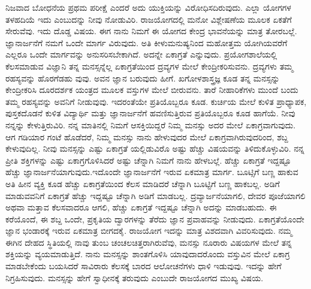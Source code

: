 ನಿಜವಾದ ಬೋಧನೆಯ ಪ್ರಥಮ ಪರೀಕ್ಷೆ ಎಂದರೆ ಅದು ಯುಕ್ತಿಯನ್ನು ವಿರೋಧಿಸದಿರುವುದು. ಎಲ್ಲಾ ಯೋಗಗಳ ತಳಹದಿಯೆ ಇದು ಎಂಬುದನ್ನು ನೀವು ನೋಡುವಿರಿ. ರಾಜಯೋಗದಲ್ಲಿ ಮನೋ ವಿಶ್ಲೇಷಣೆಯ ಮೂಲಕ ಏಕತೆಗೆ ಸೇರುವೆವು. ಇದು ದೊಡ್ಡ ವಿಷಯ. ಈಗ ನಾನು ನಿಮಗೆ ಈ ಯೋಗದ ಕೇಂದ್ರ ಭಾವನೆಯನ್ನು ಮಾತ್ರ ತೋರಬಲ್ಲೆ. ಜ್ಞಾನಾರ್ಜನೆಗೆ ನಮಗೆ ಒಂದೇ ಮಾರ್ಗ ವಿರುವುದು. ಅತಿ ಕೀಳುಮನುಷ್ಯನಿಂದ ಮಹೋತ್ತಮ ಯೋಗಿಯವರೆಗೆ ಎಲ್ಲರೂ ಒಂದೇ ಮಾರ್ಗವನ್ನು ಅನುಸರಿಸಬೇಕಾಗಿದೆ. ಅದನ್ನೇ ಏಕಾಗ್ರತೆ ಎನ್ನುವುದು. ಪ್ರಯೋಗಶಾಲೆಯಲ್ಲಿ ಕೆಲಸಮಾಡುವ ವಿಜ್ಞಾನಿ ತನ್ನ ಮನಸ್ಸನ್ನೆಲ್ಲ ಏಕಾಗ್ರತೆಯಿಂದ ದ್ರವ್ಯಗಳ ಮೇಲೆ ಕೇಂದ್ರೀಕರಿಸುವನು. ದ್ರವ್ಯಗಳು ತಮ್ಮ ರಹಸ್ಯವನ್ನು ಹೊರಗೆಡಹು ವುವು. ಅವನ ಜ್ಞಾನ ಬರುವುದು ಹೀಗೆ. ಖಗೋಳಶಾಸ್ತ್ರಜ್ಞ ಕೂಡ ತನ್ನ ಮನಸ್ಸನ್ನು ಕೇಂದ್ರೀಕರಿಸಿ ದೂರದರ್ಶಕ ಯಂತ್ರದ ಮೂಲಕ ವಸ್ತುಗಳ ಮೇಲೆ ಬೀರುವನು. ತಾರೆ ನೀಹಾರಿಕೆಗಳು ಮುಂದೆ ಬಂದು ತಮ್ಮ ರಹಸ್ಯವನ್ನು ಅವನಿಗೆ ನೀಡುವುವು. ಇದರಂತೆಯೇ ಪ್ರತಿಯೊಬ್ಬರೂ ಕೂಡ. ಕುರ್ಚಿಯ ಮೇಲೆ ಕುಳಿತ ಪ್ರಾಧ್ಯಾಪಕ, ಪುಸ್ತಕದೊಡನೆ ಕುಳಿತ ವಿದ್ಯಾರ್ಥಿ ಮತ್ತು ಜ್ಞಾನಾರ್ಜನೆಗೆ ಹವಣಿಸುತ್ತಿರುವ ಪ್ರತಿಯೊಬ್ಬರೂ ಕೂಡ ಹಾಗೆಯೆ. ನೀವು ನನ್ನನ್ನು ಕೇಳುತ್ತಿರುವಿರಿ. ನನ್ನ ಮಾತಿನಲ್ಲಿ ನಿಮಗೆ ಆಸಕ್ತಿಯಿದ್ದರೆ ನಿಮ್ಮ ಮನಸ್ಸು ಅದರ ಮೇಲೆ ಏಕಾಗ್ರವಾಗುವುದು. ಆಗ ಗಡಿಯಾರ ಗಂಟೆ ಹೊಡೆದರೆ, ನಿಮ್ಮ ಮನಸ್ಸು ನಾನು ಹೇಳುವುದರ ಮೇಲೆ ಏಕಾಗ್ರವಾಗಿರುವುದರಿಂದ, ಶಬ್ದ ಕೇಳುವುದಿಲ್ಲ. ನೀವು ಮನಸ್ಸನ್ನು ಎಷ್ಟು ಏಕಾಗ್ರತೆ ಯಲ್ಲಿಡುವಿರೊ ಅಷ್ಟು ಹೆಚ್ಚು ವಿಷಯವನ್ನು ತಿಳಿದುಕೊಳ್ಳುವಿರಿ. ನನ್ನ ಪ್ರೀತಿ ಶಕ್ತಿಗಳನ್ನು ಎಷ್ಟು ಏಕಾಗ್ರಗೊಳಿಸಿದರೆ ಅಷ್ಟು ಚೆನ್ನಾಗಿ ನಿಮಗೆ ನಾನು ಹೇಳಬಲ್ಲೆ. ಹೆಚ್ಚು ಏಕಾಗ್ರತೆ ಇದ್ದಷ್ಟೂ ಹೆಚ್ಚು ಜ್ಞಾನಾರ್ಜನೆಯಾಗುವುದು.ಇದೊಂದೇ ಜ್ಞಾನಾರ್ಜನೆಗೆ ಇರುವ ಏಕಮಾತ್ರ ಮಾರ್ಗ. ಬೂಟ್ಸಿಗೆ ಬಣ್ಣ ಹಾಕುವ ಅತಿ ಹೀನ ವ್ಯಕ್ತಿ ಕೂಡ ಹೆಚ್ಚು ಏಕಾಗ್ರತೆಯಿಂದ ಕೆಲಸ ಮಾಡಿದರೆ ಚೆನ್ನಾಗಿ ಬೂಟ್ಟಿಗೆ ಬಣ್ಣ ಹಾಕಬಲ್ಲ. ಅಡಿಗೆ ಮಾಡುವವನಿಗೆ ಏಕಾಗ್ರತೆ ಹೆಚ್ಚು ಇದ್ದಷ್ಟೂ ಚೆನ್ನಾಗಿ ಅಡಿಗೆ ಮಾಡಬಲ್ಲ. ದ್ರವ್ಯಾರ್ಜನೆಯಾಗಲಿ, ದೇವರ ಪೂಜೆಯಾಗಲಿ ಅಥವಾ ಮತ್ತಾವ ಕೆಲಸವಾದರೂ ಆಗಲಿ, ಹೆಚ್ಚು ಏಕಾಗ್ರತೆ ಇದ್ದಷ್ಟೂ ಚೆನ್ನಾಗಿ ಅದನ್ನು ಮಾಡಬಹುದು. ಈ ಕರೆಯೊಂದೆ, ಈ ಶಬ್ದ ಒಂದೇ, ಪ್ರಕೃತಿಯ ದ್ವಾರಗಳನ್ನು ತೆರೆದು ಜ್ಞಾನ ಪ್ರವಾಹವನ್ನು ನೀಡುವುದು. ಏಕಾಗ್ರತೆಯೊಂದೇ ಜ್ಞಾನ ಭಂಡಾರಕ್ಕೆ ಇರುವ ಏಕಮಾತ್ರ ಬೀಗದಕೈ. ರಾಜಯೋಗ ಇದನ್ನು ಮಾತ್ರ ವಿಶದವಾಗಿ ವಿವರಿಸುವುದು. ನಮ್ಮ ಈಗಿನ ದೇಹದ ಸ್ಥಿತಿಯಲ್ಲಿ ನಾವು ತುಂಬ ಚಂಚಲಚಿತ್ತರಾಗಿರುವೆವು, ಮನಸ್ಸು ನೂರಾರು ವಿಷಯಗಳ ಮೇಲೆ ತನ್ನ ಶಕ್ತಿಯನ್ನು ವ್ಯಯಮಾಡುತ್ತಿದೆ. ನಾನು ಮನಸ್ಸನ್ನು ಶಾಂತಗೊಳಿಸಿ ಯಾವುದಾದರೊಂದು ವಸ್ತುವಿನ ಮೇಲೆ ಏಕಾಗ್ರ ಮಾಡಬೇಕೆಂದು ಬಯಸಿದರೆ ಸಾವಿರಾರು ಕೆಲಸಕ್ಕೆ ಬಾರದ ಆಲೋಚನೆಗಳು ಧಾಳಿ ಇಡುವುವು. ಇದನ್ನು ಹೇಗೆ ನಿಗ್ರಹಿಸುವುದು. ಮನಸ್ಸನ್ನು ಹೇಗೆ ಸ್ವಾಧೀನಕ್ಕೆ ತರುವುದು ಎಂಬುದೇ ರಾಜಯೋಗದ ಮುಖ್ಯ ವಿಷಯ.

